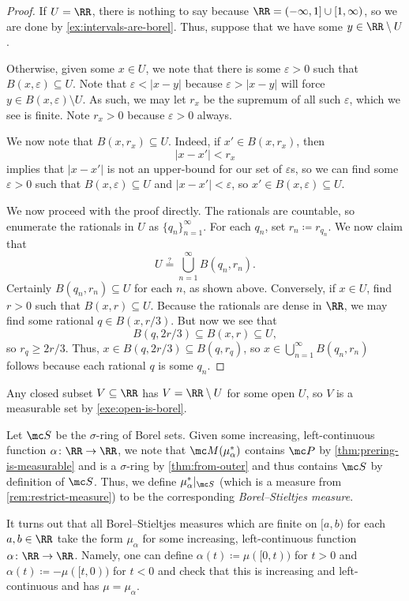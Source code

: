 \documentclass[../notes.tex]{subfiles}
\begin{document}
\begin{proof}
	If $U=\RR$, there is nothing to say because $\RR=(-\infty,1]\cup[1,\infty)$, so we are done by \autoref{ex:intervals-are-borel}. Thus, suppose that we have some $y\in\RR\setminus U$.

	Otherwise, given some $x\in U$, we note that there is some $\varepsilon>0$ such that $B(x,\varepsilon)\subseteq U$. Note that $\varepsilon<|x-y|$ because $\varepsilon>|x-y|$ will force $y\in B(x,\varepsilon)\setminus U$. As such, we may let $r_x$ be the supremum of all such $\varepsilon$, which we see is finite. Note $r_x>0$ because $\varepsilon>0$ always.

	We now note that $B(x,r_x)\subseteq U$. Indeed, if $x'\in B(x,r_x)$, then
	\[|x-x'|<r_x\]
	implies that $|x-x'|$ is not an upper-bound for our set of $\varepsilon$s, so we can find some $\varepsilon>0$ such that $B(x,\varepsilon)\subseteq U$ and $|x-x'|<\varepsilon$, so $x'\in B(x,\varepsilon)\subseteq U$.

	We now proceed with the proof directly. The rationals are countable, so enumerate the rationals in $U$ as $\{q_n\}_{n=1}^\infty$. For each $q_n$, set $r_n\coloneqq r_{q_n}$. We now claim that
	\[U\stackrel?=\bigcup_{n=1}^\infty B(q_n,r_n).\]
	Certainly $B(q_n,r_n)\subseteq U$ for each $n$, as shown above. Conversely, if $x\in U$, find $r>0$ such that $B(x,r)\subseteq U$. Because the rationals are dense in $\RR$, we may find some rational $q\in B(x,r/3)$. But now we see that
	\[B(q,2r/3)\subseteq B(x,r)\subseteq U,\]
	so $r_q\ge2r/3$. Thus, $x\in B(q,2r/3)\subseteq B(q,r_q)$, so $x\in\bigcup_{n=1}^\infty B(q_n,r_n)$ follows because each rational $q$ is some $q_n$.
\end{proof}
\begin{example} \label{ex:closed-is-borel}
	Any closed subset $V\subseteq\RR$ has $V=\RR\setminus U$ for some open $U$, so $V$ is a measurable set by \autoref{exe:open-is-borel}.
\end{example}
\begin{definition}
	Let $\mc S$ be the $\sigma$-ring of Borel sets. Given some increasing, left-continuous function $\alpha\colon\RR\to\RR$, we note that $\mc M(\mu_\alpha^*)$ contains $\mc P$ by \autoref{thm:prering-is-measurable} and is a $\sigma$-ring by \autoref{thm:from-outer} and thus contains $\mc S$ by definition of $\mc S$. Thus, we define $\mu_\alpha^*|_{\mc S}$ (which is a measure from \autoref{rem:restrict-measure}) to be the corresponding \textit{Borel--Stieltjes measure}.
\end{definition}
\begin{remark}
	It turns out that all Borel--Stieltjes measures which are finite on $[a,b)$ for each $a,b\in\RR$ take the form  $\mu_\alpha$ for some increasing, left-continuous function $\alpha\colon\RR\to\RR$. Namely, one can define $\alpha(t)\coloneqq\mu([0,t))$ for $t>0$ and $\alpha(t)\coloneqq-\mu([t,0))$ for $t<0$ and check that this is increasing and left-continuous and has $\mu=\mu_\alpha$.
\end{remark}
\end{document}
